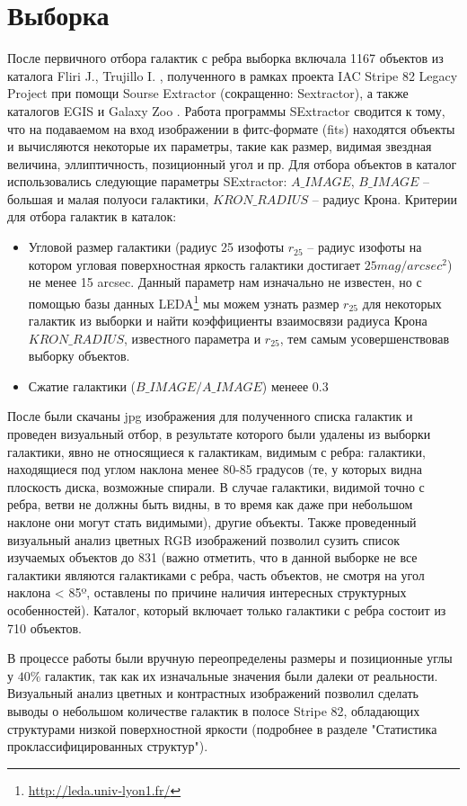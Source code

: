\section{Выборка}
После первичного отбора галактик с ребра выборка включала 1167 объектов из каталога Fliri J., Trujillo I. \cite{2016MNRAS.456.1359F}, полученного в рамках проекта IAC Stripe 82 Legacy Project при помощи Sourse Extractor (сокращенно: Sextractor), а также каталогов EGIS\cite{2014ApJ...787...24B} и Galaxy Zoo \cite{2017yCat..74613663H}.
Работа программы SExtractor сводится к тому, что на подаваемом на вход
изображении в фитс-формате (fits) находятся объекты и вычисляются
некоторые их параметры, такие как размер, видимая звездная величина, эллиптичность, позиционный угол и пр. 
Для отбора объектов в каталог использовались следующие параметры SExtractor: $A\_IMAGE$, $B\_IMAGE$ -- большая и малая полуоси галактики, $KRON\_RADIUS$ -- радиус Крона. 
Критерии для отбора галактик в каталок:
\begin{itemize}
    \item Угловой размер галактики (радиус 25 изофоты $r_{25}$ -- радиус изофоты на котором угловая поверхностная яркость галактики достигает  $25 mag/arcsec^2$) не менее 15 arcsec. Данный параметр нам изначально не известен, но с помощью базы данных LEDA\footnote{\url{http://leda.univ-lyon1.fr/}} мы можем узнать размер $r_{25}$  для некоторых галактик из выборки и найти коэффициенты взаимосвязи радиуса Крона $KRON\_RADIUS$, известного параметра и $r_{25}$, тем самым усовершенствовав выборку объектов.
    \item Сжатие галактики ($B\_IMAGE/A\_IMAGE$) менеее 0.3
\end{itemize}

После были скачаны jpg изображения для полученного списка галактик и проведен визуальный отбор, в результате которого были удалены из выборки галактики, явно не относящиеся к галактикам, видимым с ребра: галактики, находящиеся под углом наклона менее 80-85 градусов (те, у которых видна плоскость диска, возможные спирали. В случае галактики, видимой точно с ребра, ветви не должны быть видны, в то время как даже при небольшом наклоне они могут стать видимыми), другие объекты.
Также проведенный визуальный анализ цветных RGB изображений позволил сузить список изучаемых объектов до 831 (важно отметить, что в данной выборке не все галактики являются галактиками с ребра, часть  объектов, не смотря на угол наклона < 85º, оставлены по причине наличия интересных структурных особенностей). Каталог, который включает только галактики с ребра состоит из 710 объектов.

В процессе работы были вручную переопределены размеры и позиционные углы у $40\%$ галактик, так как их изначальные значения были далеки от реальности.
Визуальный анализ цветных и контрастных изображений позволил сделать выводы о небольшом количестве галактик в полосе Stripe 82, обладающих структурами низкой поверхностной яркости (подробнее в разделе "Статистика проклассифицированных структур").  